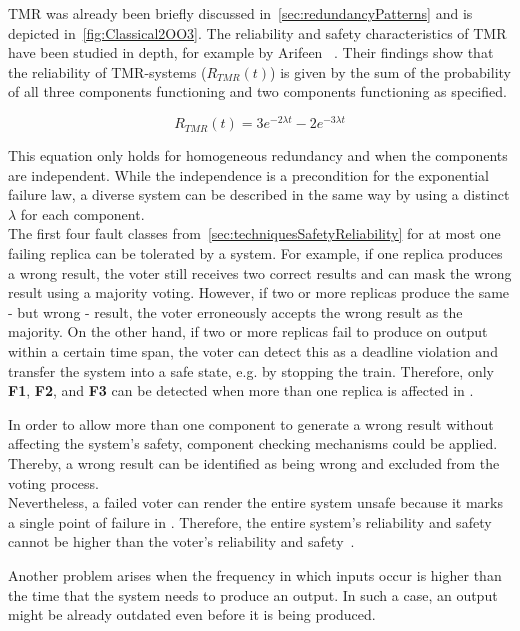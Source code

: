 \Gls*{TMR} was already been briefly discussed in~\autoref{sec:redundancyPatterns} and is depicted in~\autoref{fig:Classical2OO3}.
The reliability and safety characteristics of \gls*{TMR} have been studied in depth, for example by Arifeen \etal~\cite{ArifeenFaultTolerantTMR}.
Their findings show that the reliability of \gls*{TMR}-systems ($R_{TMR}(t)$) is given by the sum of the probability of all three components functioning and two components functioning as specified.

\begin{equation}
R_{TMR}(t) = 3e^{-2 \lambda t} - 2e^{-3 \lambda t}
\end{equation}

This equation only holds for homogeneous redundancy and when the components are independent.
While the independence is a precondition for the exponential failure law, a diverse system can be described in the same way by using a distinct $\lambda$ for each component.
\\

The first four fault classes from~\autoref{sec:techniquesSafetyReliability} for at most one failing replica can be tolerated by a  system.
For example, if one replica produces a wrong result, the voter still receives two correct results and can mask the wrong result using a majority voting.
However, if two or more replicas produce the same - but wrong - result, the voter erroneously accepts the wrong result as the majority.
On the other hand, if two or more replicas fail to produce on output within a certain time span, the voter can detect this as a deadline violation and transfer the system into a safe state, e.g. by stopping the train.
Therefore, only \textbf{F1}, \textbf{F2}, and \textbf{F3} can be detected when more than one replica is affected in .

In order to allow more than one component to generate a wrong result without affecting the system's safety, component checking mechanisms could be applied.
Thereby, a wrong result can be identified as being wrong and excluded from the voting process.
\\

Nevertheless, a failed voter can render the entire system unsafe because it marks a single point of failure in .
Therefore, the entire system's reliability and safety cannot be higher than the voter's reliability and safety~\cite{ArifeenFaultTolerantTMR}.

Another problem arises when the frequency in which inputs occur is higher than the time that the system needs to produce an output.
In such a case, an output might be already outdated even before it is being produced.
\\

